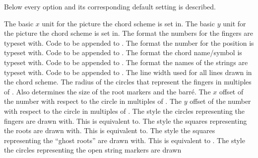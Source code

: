 \documentclass[toc=index,toc=bib]{cnpkgdoc}
\begin{document}
Below every option and its corresponding default setting is described.
\begin{beschreibung}
 \Default{.8cm}
   The basic $x$ unit for the \TikZ{} picture the chord scheme is set in.
 \Default{.8cm}
   The basic $y$ unit for the \TikZ{} picture the chord scheme is set in.
   The format the numbers for the fingers are typeset with.
 \Default{}
   Code to be appended to .
   The format the number for the position is typeset with.
 \Default{}
   Code to be appended to .
   The format the chord name/symbol is typeset with.
 \Default{}
   Code to be appended to .
   The format the names of the strings are typeset with.
 \Default{}
   Code to be appended to .
 \Default{1pt}
   The line width used for all lines drawn in the chord scheme.
   The radius of the circles that represent the fingers in multiples of
   . Also determines the size of the root markers and the barr\'e.
   The $x$ offset of the number with respect to the circle in multiples of
   .
   The $y$ offset of the number with respect to the circle in multiples of
   .
   The \TikZ{} style the circles representing the fingers are drawn with.
   This is equivalent to\linebreak {}.
   The \TikZ{} style the squares representing the roots are drawn with.
   This is equivalent to\linebreak {}.
   The \TikZ{} style the squares representing the “ghost roots” are drawn with.
   This is equivalent to .
   The \TikZ{} style the circles representing the open string markers are drawn

\end{beschreibung}
\end{document}
